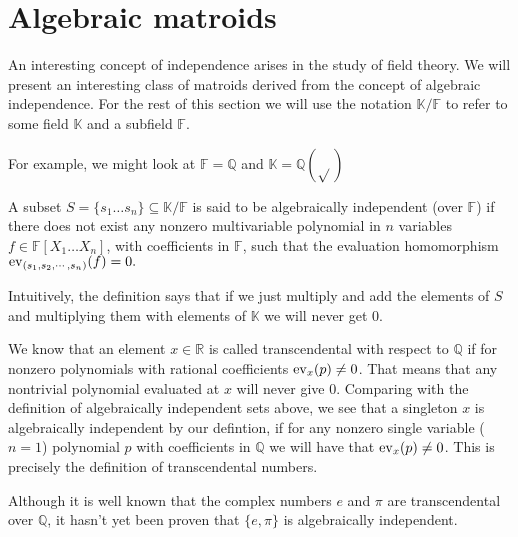 \section{Algebraic matroids}

An interesting concept of independence arises in the study of field theory. We will present an interesting class of matroids derived from the concept of algebraic independence. For the rest of this section we will use the notation $\mathbb K / \mathbb F$ to refer to some field $\mathbb K$ and a subfield $\mathbb F$.


\begin{exmp}
    For example, we might look at $\mathbb{F} = \mathbb{Q}$ and $\mathbb{K} = \mathbb{Q}(
    \sqrt{})$
\end{exmp}

\begin{defn}
  A subset $S = \{ s_1 \ldots s _n \} \subseteq \mathbb K / \mathbb F$ is said to be algebraically independent (over $\mathbb F$) if there does not exist any 
  nonzero multivariable polynomial in $n$ variables $f \in \mathbb{F}[X _1 \ldots X _n]$, with coefficients in $\mathbb{F} $, such that the evaluation homomorphism $\mathrm{ev}_{(s_1, s_2,\cdots,s_n)}(f) = 0.$  
\end{defn}
Intuitively, the definition says that if we just multiply and add the elements of $S$ and multiplying them with elements of $\mathbb{K}$ we will never get 0.



We know that an element $x\in \mathbb{R}$ is called transcendental with respect to $\mathbb{Q}$ if for nonzero polynomials with rational coefficients $\mathrm{ev}_{x}(p) \neq 0$. That means that any nontrivial polynomial evaluated at $x$ will never give 0.
Comparing with the definition of algebraically independent sets above, we see that a singleton ${x}$ is algebraically independent by our defintion, if for any nonzero  single variable ($n = 1$) polynomial $p$ with coefficients in $\mathbb{Q}$ we will have that $\mathrm{ev}_{x}(p) \neq 0$. This is precisely the definition of transcendental numbers.



Although it is well known that the complex numbers $e$ and $\pi$ are transcendental over $\mathbb{Q}$, it hasn't yet been proven that $\{e, \pi \}$ is algebraically independent.

